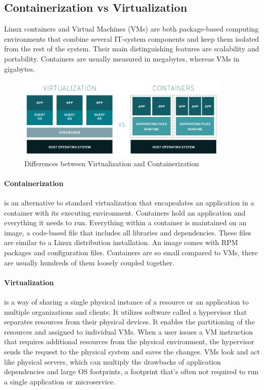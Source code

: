 	\subsection{Containerization vs Virtualization}
	Linux containers and Virtual Machines (VMs) are both package-based computing environments that combine several IT-system components and keep them isolated from the rest of the system. Their main distinguishing features are scalability and portability. Containers are usually measured in megabytes, whereas VMs in gigabytes.
	\cite{containersRedHat}
	\begin{figure}[H]
		\centering
		\includegraphics[width=0.9\textwidth]{"Bilder/virtualization-vs-containers_transparent.png"}
		\caption{Differences between Virtualization and Containerization \cite{containersRedHat}}
		\label{fig:Background:Containers:Containers vs VMs}					
	\end{figure}

	\paragraph*{Containerization} is an alternative to standard virtualization that encapsulates an application in a container with its executing environment.
	Containers hold an application and everything it needs to run. Everything within a container is maintained on an image, a code-based file that includes all libraries and dependencies. These files are similar to a Linux distribution installation. An image comes with RPM packages and configuration files. Containers are so small compared to VMs, there are usually hundreds of them loosely coupled together.\cite{containersRedHat}
	
	\paragraph*{Virtualization} is a way of sharing a single physical instance of a resource or an application to multiple organizations and clients. It utilizes software called a hypervisor that separates resources from their physical devices. It enables the partitioning of the resources and assigned to individual VMs. When a user issues a VM instruction that requires additional resources from the physical environment, the hypervisor sends the request to the physical system and saves the changes. VMs look and act like physical servers, which can multiply the drawbacks of application dependencies and large OS footprints, a footprint that's often not required to run a single application or microservice.\cite{containersRedHat} \\

